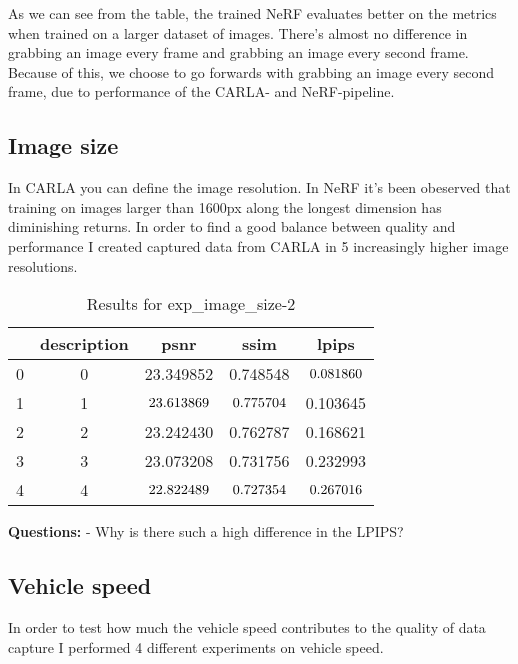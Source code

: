 As we can see from the table, the trained NeRF evaluates better on the metrics when trained on a larger dataset of images. There's almost no difference in grabbing an image every frame and grabbing an image every second frame. Because of this, we choose to go forwards with grabbing an image every second frame, due to performance of the CARLA- and NeRF-pipeline.

\subsection{Image size}
In CARLA you can define the image resolution. In NeRF it's been obeserved that training on images larger than 1600px along the longest dimension has diminishing returns. In order to find a good balance between quality and performance I created captured data from CARLA in 5 increasingly higher image resolutions.

\begin{table}[ht]
\centering
\begin{tabular}{|l|c|c|c|c|}
\hline
& description & psnr & ssim & lpips \\
\hline
0 & 0 & 23.349852 & 0.748548 & $\cellcolor{green} 0.081860$ \\
\cline{1-5}
1 & 1 & $\cellcolor{green} 23.613869$ & $\cellcolor{green} 0.775704$ & 0.103645 \\
\cline{1-5}
2 & 2 & 23.242430 & 0.762787 & 0.168621 \\
\cline{1-5}
3 & 3 & 23.073208 & 0.731756 & 0.232993 \\
\cline{1-5}
4 & 4 & $\cellcolor{red} 22.822489$ & $\cellcolor{red} 0.727354$ & $\cellcolor{red} 0.267016$ \\
\cline{1-5}
\end{tabular}
\caption{Results for exp\_image\_size-2}
\label{tab:exp_image_size-2}
\end{table}

\textbf{Questions:}
- Why is there such a high difference in the LPIPS?



\subsection{Vehicle speed}
In order to test how much the vehicle speed contributes to the quality of data capture I performed 4 different experiments on vehicle speed.

